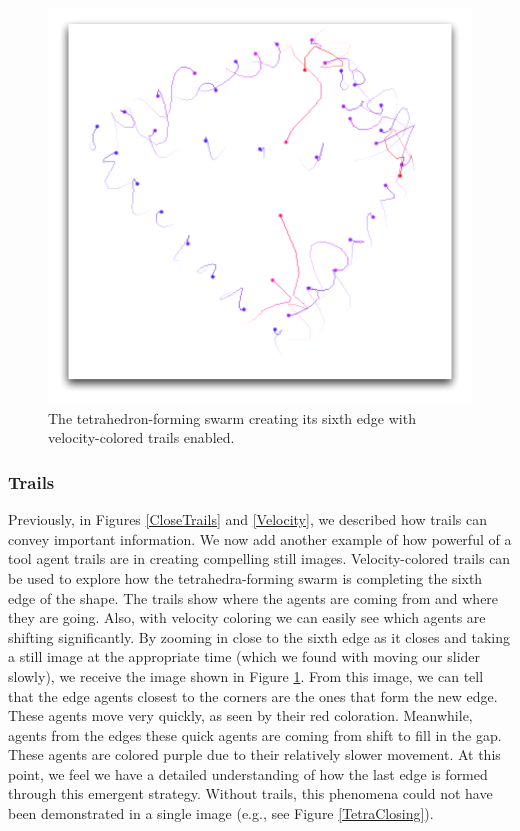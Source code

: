 \documentclass[conference]{IEEEtran}
\begin{document}
\begin{figure}
\centering
\includegraphics[scale=.55]{images/tetrastrategy.pdf}
\caption{
The tetrahedron-forming swarm creating its sixth edge with velocity-colored trails enabled.
}
\label{TetraStrategy}
\end{figure}

\subsubsection{Trails}
Previously, in Figures \ref{CloseTrails} and \ref{Velocity}, we described how trails can convey important information.
We now add another example of how powerful of a tool agent trails are in creating compelling still images.
Velocity-colored trails can be used to explore how the tetrahedra-forming swarm is completing the sixth edge of the shape.
The trails show where the agents are coming from and where they are going.
Also, with velocity coloring we can easily see which agents are shifting significantly.
By zooming in close to the sixth edge as it closes and taking a still image at the appropriate time (which we found
with moving our slider slowly), we receive the image shown in Figure \ref{TetraStrategy}.
From this image, we can tell that the edge agents closest to the corners are the ones that form the new edge.
These agents move very quickly, as seen by their red coloration.
Meanwhile, agents from the edges these quick agents are coming from shift to fill in the gap.
These agents are colored purple due to their relatively slower movement.
At this point, we feel we have a detailed understanding of how the last edge is formed through this emergent strategy.
Without trails, this phenomena could not have been demonstrated in a single image (e.g., see Figure \ref{TetraClosing}).
\end{document}

